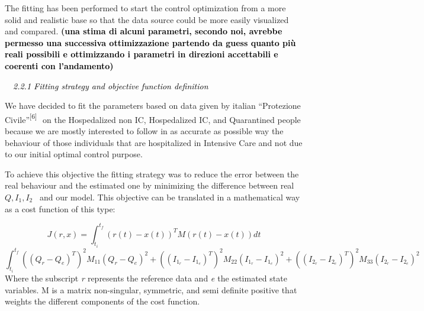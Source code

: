 \documentclass[a4paper]{article}
\begin{document}
\textcolor[rgb]{0.07450981,0.078431375,0.07450981}{The fitting has been performed to start the control optimization from
a more solid and realistic base so that the data source could be more easily visualized and compared.
}\textbf{\textcolor[rgb]{0.07450981,0.078431375,0.07450981}{(}}\textbf{\textcolor{black}{una stima di alcuni parametri,
secondo noi, avrebbe permesso una successiva ottimizzazione partendo da guess quanto più reali possibili e ottimizzando
i parametri in direzioni accettabili e coerenti con l’andamento)}}


\bigskip


\bigskip


\bigskip


\bigskip

\textcolor{black}{\ \ }\textit{\textcolor{black}{2.2.1 Fitting strategy and objective function definition }}

\textcolor[rgb]{0.07450981,0.078431375,0.07450981}{We have decided to fit the parameters based on data given by italian
“Protezione Civile”}\textcolor[rgb]{0.07450981,0.078431375,0.07450981}{\textsuperscript{[6]
\ }}\textcolor[rgb]{0.07450981,0.078431375,0.07450981}{on the Hospedalized non IC, Hospedalized IC, and Quarantined
people because we are mostly interested to follow in as accurate as possible way the behaviour of those individuals
that are hospitalized in Intensive Care and not due to our initial optimal control purpose. }

\textcolor[rgb]{0.07450981,0.078431375,0.07450981}{To achieve this objective the fitting strategy was to reduce the
error between the real behaviour and the estimated one by minimizing the difference between real } $Q,I_1,I_2$ \ and
\textcolor[rgb]{0.07450981,0.078431375,0.07450981}{our model. This objective can be translated in a mathematical way as
a cost function of this type:}


\bigskip


\bigskip

\begin{equation*}
J\left(r,x\right)=\int
_{t_i}^{t_f}\left(r\left(t\right)-x\left(t\right)\right)^TM\left(r\left(t\right)-x\left(t\right)\right)\mathit{dt}
\end{equation*}
\begin{equation*}
\int
_{t_i}^{t_f}\left(\left(Q_r-Q_e\right)^T\right)^2M_{11}\left(Q_r-Q_e\right)^2+\left(\left(I_{1_r}-I_{1_e}\right)^T\right)^2M_{22}\left(I_{1_r}-I_{1_e}\right)^2+\left(\left(I_{2_r}-I_{2_e}\right)^T\right)^2M_{33}\left(I_{2_r}-I_{2_e}\right)^2
\end{equation*}
\textcolor[rgb]{0.07450981,0.078431375,0.07450981}{Where the subscript
}\textit{\textcolor[rgb]{0.07450981,0.078431375,0.07450981}{r
}}\textcolor[rgb]{0.07450981,0.078431375,0.07450981}{represents the reference data and
}\textit{\textcolor[rgb]{0.07450981,0.078431375,0.07450981}{e }}\textcolor[rgb]{0.07450981,0.078431375,0.07450981}{the
estimated state variables. M is a matrix non-singular, symmetric, and semi definite positive that weights the different
components of the cost function. }
\end{document}
